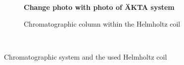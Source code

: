 \begin{figure}[H]
		\centering
          \begin{subfigure}{0.49\textwidth}
                  \flushleft
                  \caption{\textbf{Change photo with photo of ÄKTA system}}\label{fig:Bioreactor_Geometry}
          \end{subfigure}
        \begin{subfigure}{0.49\textwidth}
                \flushright
                \caption{Chromatographic column within the Helmholtz coil}\label{fig:Bioreactor_cross_section}
        \end{subfigure}
        \\
        
        \caption{Chromatographic system and the used Helmholtz coil}
        \label{fig:Bioreactor}
  \end{figure}  


